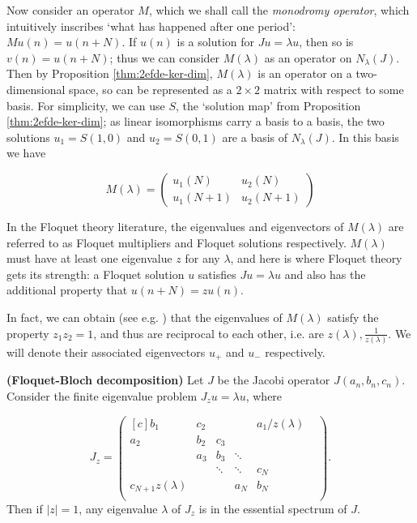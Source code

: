 \documentclass[../main.tex]{subfiles}
\begin{document}
Now consider an operator $M$, which we shall call the \emph{monodromy operator}, which intuitively inscribes `what has happened after one period': $Mu(n) = u(n+N)$. If $u(n)$ is a solution for $Ju = \lambda u$, then so is $v(n) = u(n+N)$; thus we can consider $M(\lambda)$ as an operator on $N_\lambda (J)$. Then by Proposition \ref{thm:2efde-ker-dim}, $M(\lambda)$ is an operator on a two-dimensional space, so can be represented as a $2 \times 2$ matrix with respect to some basis. For simplicity, we can use $S$, the `solution map' from Proposition \ref{thm:2efde-ker-dim}; as linear isomorphisms carry a basis to a basis, the two solutions $u_1 = S(1, 0)$ and $u_2 = S(0, 1)$ are a basis of $N_\lambda (J)$. In this basis we have

$$M(\lambda) =
\begin{pmatrix}
u_1(N) & u_2(N) \\
u_1(N+1) & u_2(N+1)
\end{pmatrix}
$$

In the Floquet theory literature, the eigenvalues and eigenvectors of $M(\lambda)$ are referred to as Floquet multipliers and Floquet solutions respectively. $M(\lambda)$ must have at least one eigenvalue $z$ for any $\lambda$, and here is where Floquet theory gets its strength: a Floquet solution $u$ satisfies $Ju = \lambda u$ and also has the additional property that $u(n+N) = zu(n).$

In fact, we can obtain (see e.g. \cite{teschl2000jacobi}) that the eigenvalues of $M(\lambda)$ satisfy the property $z_1 z_2 = 1$, and thus are reciprocal to each other, i.e. are $z(\lambda), \frac{1}{z(\lambda)}$. We will denote their associated eigenvectors $u_+$ and $u_-$ respectively.

\begin{proposition}{\textbf{(Floquet-Bloch decomposition)}}
Let $J$ be the Jacobi operator $J(a_n, b_n, c_n)$. Consider the finite eigenvalue problem $J_z u = \lambda u$, where

\begin{equation}\label{eqn:floquet-bloch}
J_z = 
\begin{pmatrix*}[c]
b_1 & c_2 & & & a_1/z(\lambda)\\
a_2 & b_2 & c_3 & & & \\
& a_3 & b_3 & \ddots & & \\
& & \ddots & \ddots & c_N & \\
c_{N+1} z(\lambda) & & & a_N & b_N\\
\end{pmatrix*}.
\end{equation}
Then if $|z|=1$, any eigenvalue $\lambda$ of $J_z$ is in the essential spectrum of $J$.
\end{proposition}
\end{document}
